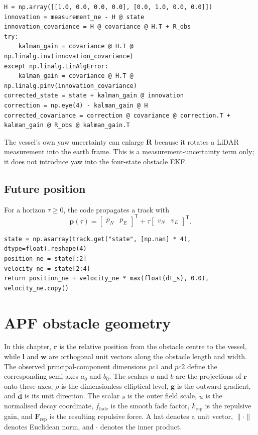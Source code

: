 \documentclass[11pt,a4paper]{article}
\begin{document}
\begin{lstlisting}
H = np.array([[1.0, 0.0, 0.0, 0.0], [0.0, 1.0, 0.0, 0.0]])
innovation = measurement_ne - H @ state
innovation_covariance = H @ covariance @ H.T + R_obs
try:
    kalman_gain = covariance @ H.T @ np.linalg.inv(innovation_covariance)
except np.linalg.LinAlgError:
    kalman_gain = covariance @ H.T @ np.linalg.pinv(innovation_covariance)
corrected_state = state + kalman_gain @ innovation
correction = np.eye(4) - kalman_gain @ H
corrected_covariance = correction @ covariance @ correction.T + kalman_gain @ R_obs @ kalman_gain.T
\end{lstlisting}

The vessel's own yaw uncertainty can enlarge $\bm{R}$ because it rotates a
LiDAR measurement into the earth frame. This is a measurement-uncertainty
term only; it does not introduce yaw into the four-state obstacle EKF.

\subsection{Future position}

For a horizon $\tau\geq0$, the code propagates a track with
\begin{equation}
\bm{p}(\tau)=\begin{bmatrix}p_N&p_E\end{bmatrix}^{\mathsf T}
+\tau\begin{bmatrix}v_N&v_E\end{bmatrix}^{\mathsf T}.
\end{equation}

\begin{lstlisting}
state = np.asarray(track.get("state", [np.nan] * 4), dtype=float).reshape(4)
position_ne = state[:2]
velocity_ne = state[2:4]
return position_ne + velocity_ne * max(float(dt_s), 0.0), velocity_ne.copy()
\end{lstlisting}

\section{APF obstacle geometry}

In this chapter, $\bm{r}$ is the relative position from the obstacle centre
to the vessel, while $\bm{l}$ and $\bm{w}$ are orthogonal unit vectors along
the obstacle length and width. The observed principal-component dimensions
$pc1$ and $pc2$ define the corresponding semi-axes $a_0$ and $b_0$. The
scalars $a$ and $b$ are the projections of $\bm{r}$ onto these axes, $\rho$
is the dimensionless elliptical level, $\bm{g}$ is the outward gradient,
and $\hat{\bm{d}}$ is its unit direction. The scalar $s$ is the outer field
scale, $u$ is the normalised decay coordinate, $f_{\mathrm{fade}}$ is the
smooth fade factor, $k_{\mathrm{rep}}$ is the repulsive gain, and
$\bm{F}_{\mathrm{rep}}$ is the resulting repulsive force. A hat denotes a
unit vector, $\lVert\cdot\rVert$ denotes Euclidean norm, and $\cdot$ denotes
the inner product.
\end{document}
